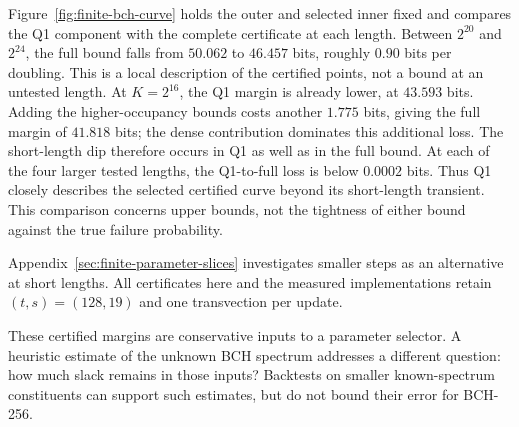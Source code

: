 Figure~\ref{fig:finite-bch-curve} holds the outer and selected inner fixed
and compares the Q1 component with the complete certificate at each length.
Between $2^{20}$ and $2^{24}$, the full bound falls from $50.062$ to
$46.457$ bits, roughly $0.90$ bits per doubling. This is a local description
of the certified points, not a bound at an untested length. At $K=2^{16}$,
the Q1 margin is already lower, at $43.593$ bits. Adding the higher-occupancy
bounds costs another $1.775$ bits, giving the full margin of $41.818$ bits;
the dense contribution dominates this additional loss. The short-length
dip therefore occurs in Q1 as well as in the full bound.
At each of the four larger tested lengths, the Q1-to-full loss is below
$0.0002$ bits.
Thus Q1 closely describes the selected certified curve beyond its
short-length transient. This comparison concerns upper bounds, not the
tightness of either bound against the true failure probability.



Appendix~\ref{sec:finite-parameter-slices} investigates smaller steps as
an alternative at short lengths. All certificates here and the measured
implementations retain $(t,s)=(128,19)$ and one transvection per update.

These certified margins are conservative inputs to a parameter selector.
A heuristic estimate of the unknown BCH spectrum addresses a different
question: how much slack remains in those inputs? Backtests on smaller
known-spectrum constituents can support such estimates, but do not bound
their error for BCH-256.

\FloatBarrier


